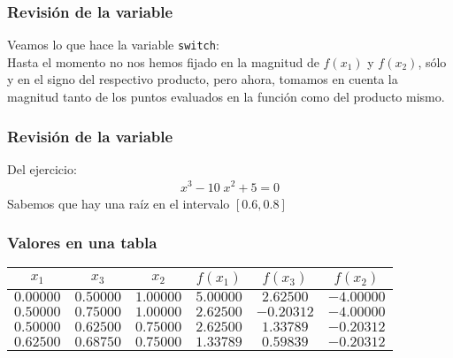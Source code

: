 \documentclass[12pt]{beamer}
\begin{document}
\begin{frame}
\frametitle{Revisión de la variable}
Veamos lo que hace la variable \texttt{switch}:
\\
\bigskip
\pause
Hasta el momento no nos hemos fijado en la magnitud de $f (x_{1})$ y $f (x_{2})$, sólo y en el signo del respectivo producto, pero ahora, tomamos en cuenta la magnitud tanto de los puntos evaluados en la función como del producto mismo.
\end{frame}
\begin{frame}
\frametitle{Revisión de la variable}
Del ejercicio:
\begin{align*}
x^{3} - 10 \; x^{2} + 5 = 0
\end{align*}
\pause
Sabemos que hay una raíz en el intervalo $[0.6, 0.8]$
\end{frame}
\begin{frame}
\frametitle{Valores en una tabla}
\begin{table}
\centering
\renewcommand{\arraystretch}{0.9}
\begin{tabular}{c | c | c | c | c | c }
$x_{1}$ & $x_{3}$ & $x_{2}$ & $f (x_{1})$ & $f (x_{3})$ & $f (x_{2})$ \\ \hline
$0.00000$ & $0.50000$ & $1.00000$ & $5.00000$ & $2.62500$	& $-4.00000$ \\ \hline
$0.50000$ & $0.75000$ & $1.00000$ & $2.62500$ & $-0.20312$	& $-4.00000$ \\ \hline
$0.50000$ & $0.62500$ & $0.75000$ & $2.62500$ & $1.33789$	& $-0.20312$ \\ \hline
$0.62500$ & $0.68750$ & $0.75000$ & $1.33789$ & $0.59839$	& $-0.20312$ \\ \hline

\end{tabular}
\end{table}
\end{frame}
\end{document}
